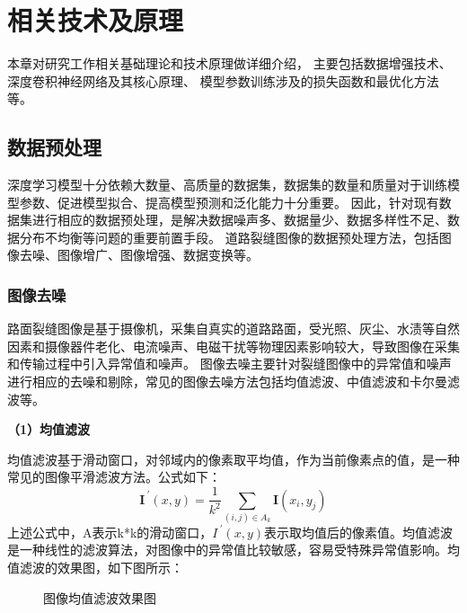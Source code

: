 \chapter{相关技术及原理}
本章对研究工作相关基础理论和技术原理做详细介绍，
主要包括数据增强技术、深度卷积神经网络及其核心原理、
模型参数训练涉及的损失函数和最优化方法等。

\section{数据预处理}
深度学习模型十分依赖大数量、高质量的数据集，数据集的数量和质量对于训练模型参数、促进模型拟合、提高模型预测和泛化能力十分重要。
因此，针对现有数据集进行相应的数据预处理，是解决数据噪声多、数据量少、数据多样性不足、数据分布不均衡等问题的重要前置手段。
道路裂缝图像的数据预处理方法，包括图像去噪、图像增广、图像增强、数据变换等。
\subsection{图像去噪}
路面裂缝图像是基于摄像机，采集自真实的道路路面，受光照、灰尘、水渍等自然因素和摄像器件老化、电流噪声、电磁干扰等物理因素影响较大，导致图像在采集和传输过程中引入异常值和噪声。
图像去噪主要针对裂缝图像中的异常值和噪声进行相应的去噪和剔除，常见的图像去噪方法包括均值滤波、中值滤波和卡尔曼滤波等。

\textbf{（1）均值滤波}

均值滤波基于滑动窗口，对邻域内的像素取平均值，作为当前像素点的值，是一种常见的图像平滑滤波方法。公式如下：
\begin{equation}
	\bm{I^{~'}}(x, y) = \frac{1}{k^2}\sum_{(i, j)\in A_k}\bm{I}(x_i, y_j)
\end{equation}
上述公式中，A表示k*k的滑动窗口，$I^{~'}(x, y)$表示取均值后的像素值。均值滤波是一种线性的滤波算法，对图像中的异常值比较敏感，容易受特殊异常值影响。均值滤波的效果图，如下图所示：

\begin{figure}[H]
	\caption{图像均值滤波效果图}
	\label{mean}
\end{figure}

